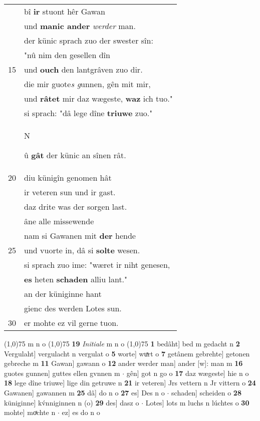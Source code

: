 \documentclass[8pt,a4paper,notitlepage]{article}
\begin{document}
\begin{table}[ht]
\begin{minipage}[t]{0.5\linewidth}
\begin{tabular}{rl}
 & bî \textbf{ir} stuont hêr Gawan\\ 
 & und \textbf{manic ander} \textit{werder} man.\\ 
 & der künic sprach zuo der swester sîn:\\ 
 & "nû nim den gesellen dîn\\ 
15 & und \textbf{ouch} den lantgrâven zuo dir.\\ 
 & die mir guote\textit{s g}unnen, gên mit mir,\\ 
 & und \textbf{râtet} mir daz wægeste, \textbf{waz} ich tuo."\\ 
 & si sprach: "dâ lege dîne \textbf{triuwe} zuo."\\ 
 & \begin{large}N\end{large}û \textbf{gât} der künic an sînen rât.\\ 
20 & diu künigîn genomen hât\\ 
 & ir veteren sun und ir gast.\\ 
 & daz drite was der sorgen last.\\ 
 & âne alle missewende\\ 
 & nam si Gawanen mit \textbf{der} hende\\ 
25 & und vuorte in, dâ si \textbf{solte} wesen.\\ 
 & si sprach zuo ime: "wæret ir niht genesen,\\ 
 & \textbf{es} heten \textbf{schaden} alliu lant."\\ 
 & an der küniginne hant\\ 
 & gienc des werden Lotes sun.\\ 
30 & er mohte ez vil gerne tuon.\\ 
\end{tabular}
\scriptsize
\line(1,0){75} \newline
m n o \newline
\line(1,0){75} \newline
\textbf{19} \textit{Initiale} m n o  \newline
\line(1,0){75} \newline
\textbf{1} bedâht] bed m gedacht n \textbf{2} Vergulaht] vergulacht n vergulat o \textbf{5} worte] wuͯrt o \textbf{7} getânem gebrehte] getonen gebreche m \textbf{11} Gawan] gawann o \textbf{12} ander werder man] ander [w]: man m \textbf{16} guotes gunnen] guttes ellen gvnnen m  $\cdot$ gên] got n go o \textbf{17} daz wægeste] hie n o \textbf{18} lege dîne triuwe] lige din getruwe n \textbf{21} ir veteren] Jrs vettern n Jr vittern o \textbf{24} Gawanen] gawannen m \textbf{25} dâ] do n o \textbf{27} es] Des n o  $\cdot$ schaden] scheiden o \textbf{28} küniginne] kv́nniginnen n (o) \textbf{29} des] dasz o  $\cdot$ Lotes] lots m luchs n lúchtes o \textbf{30} mohte] moͯchte n  $\cdot$ ez] es do n o \newline
\end{minipage}
\end{table}
\end{document}
